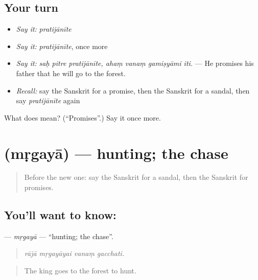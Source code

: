 \subsection*{Your turn}
\begin{itemize}
\raggedright
  \item \emph{Say it:} \emph{pratijānīte}
  \item \emph{Say it:} \emph{pratijānīte}, once more
  \item \emph{Say it:} \emph{saḥ pitre pratijānīte, ahaṃ vanaṃ gamiṣyāmi iti.} — He promises his father that he will go to the forest.
  \item \emph{Recall:} say the Sanskrit for a promise, then the Sanskrit for a sandal, then say \emph{pratijānīte} again
\end{itemize}

\begin{tcolorbox}[breakable,colback=teal!4,colframe=teal!35!black,title={Before you move on}]
What does  mean? (\textquotedblleft{}Promises\textquotedblright{}.) Say it once more.
\end{tcolorbox}
\section[\texorpdfstring{\sk{मृगया} (mṛgayā)}{मृगया (mṛgayā)}]{ (mṛgayā) — hunting; the chase}

\label{lesson:SA-C337-mrgaya}



\begin{quote}
Before the new one: say the Sanskrit for a sandal, then the Sanskrit for promises.
\end{quote}

\subsection*{You'll want to know: }
\textbf{} — \emph{mṛgayā} — \textquotedblleft{}hunting; the chase\textquotedblright{}.

\begin{quote}
   
\end{quote}

\begin{quote}
\emph{rājā mṛgayāyai vanaṃ gacchati.}
\end{quote}

\begin{quote}
The king goes to the forest to hunt.
\end{quote}

